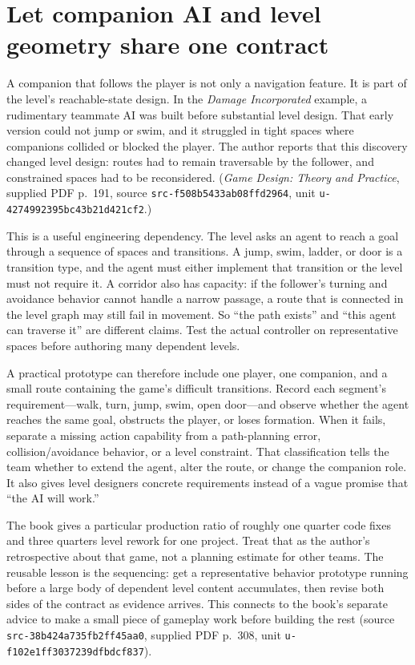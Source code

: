 \section{Let companion AI and level geometry share one contract}\label{06-engine-ii-ch047-let-companion-ai-and-level-geometry-share-one-contract}

A companion that follows the player is not only a navigation feature. It is part of the level's reachable-state design. In the \emph{Damage Incorporated} example, a rudimentary teammate AI was built before substantial level design. That early version could not jump or swim, and it struggled in tight spaces where companions collided or blocked the player. The author reports that this discovery changed level design: routes had to remain traversable by the follower, and constrained spaces had to be reconsidered. (\emph{Game Design: Theory and Practice}, supplied PDF p.~191, source \texttt{src-f508b5433ab08ffd2964}, unit \texttt{u-4274992395bc43b21d421cf2}.)

This is a useful engineering dependency. The level asks an agent to reach a goal through a sequence of spaces and transitions. A jump, swim, ladder, or door is a transition type, and the agent must either implement that transition or the level must not require it. A corridor also has capacity: if the follower's turning and avoidance behavior cannot handle a narrow passage, a route that is connected in the level graph may still fail in movement. So ``the path exists'' and ``this agent can traverse it'' are different claims. Test the actual controller on representative spaces before authoring many dependent levels.

A practical prototype can therefore include one player, one companion, and a small route containing the game's difficult transitions. Record each segment's requirement---walk, turn, jump, swim, open door---and observe whether the agent reaches the same goal, obstructs the player, or loses formation. When it fails, separate a missing action capability from a path-planning error, collision/avoidance behavior, or a level constraint. That classification tells the team whether to extend the agent, alter the route, or change the companion role. It also gives level designers concrete requirements instead of a vague promise that ``the AI will work.''

The book gives a particular production ratio of roughly one quarter code fixes and three quarters level rework for one project. Treat that as the author's retrospective about that game, not a planning estimate for other teams. The reusable lesson is the sequencing: get a representative behavior prototype running before a large body of dependent level content accumulates, then revise both sides of the contract as evidence arrives. This connects to the book's separate advice to make a small piece of gameplay work before building the rest (source \texttt{src-38b424a735fb2ff45aa0}, supplied PDF p.~308, unit \texttt{u-f102e1ff3037239dfbdcf837}).

